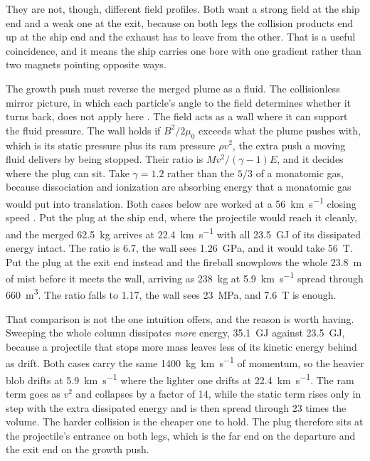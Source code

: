 \documentclass{article}
\begin{document}
They are not, though, different field profiles. Both want a strong field at the ship end and a weak one at the exit, because on both legs the collision products end up at the ship end and the exhaust has to leave from the other. That is a useful coincidence, and it means the ship carries one bore with one gradient rather than two magnets pointing opposite ways.

The growth push must reverse the merged plume as a fluid. The collisionless mirror picture, in which each particle's angle to the field determines whether it turns back, does not apply here \cite{chen2016plasma,Katz_puffsat_impact_sim_2026}. The field acts as a wall where it can support the fluid pressure. The wall holds if $B^2/2\mu_0$ exceeds what the plume pushes with, which is its static pressure plus its ram pressure $\rho v^2$, the extra push a moving fluid delivers by being stopped. Their ratio is $Mv^2/(\gamma-1)E$, and it decides where the plug can sit. Take $\gamma = 1.2$ rather than the $5/3$ of a monatomic gas, because dissociation and ionization are absorbing energy that a monatomic gas would put into translation. Both cases below are worked at a \SI{56}{\kilo\meter\per\second} closing speed \cite{Katz_aim_is_all_you_need_2025}. Put the plug at the ship end, where the projectile would reach it cleanly, and the merged \SI{62.5}{\kilogram} arrives at \SI{22.4}{\kilo\meter\per\second} with all \SI{23.5}{\giga\joule} of its dissipated energy intact. The ratio is 6.7, the wall sees \SI{1.26}{\giga\pascal}, and it would take \SI{56}{\tesla}. Put the plug at the exit end instead and the fireball snowplows the whole \SI{23.8}{\meter} of mist before it meets the wall, arriving as \SI{238}{\kilogram} at \SI{5.9}{\kilo\meter\per\second} spread through \SI{660}{\cubic\meter}. The ratio falls to 1.17, the wall sees \SI{23}{\mega\pascal}, and \SI{7.6}{\tesla} is enough.

That comparison is not the one intuition offers, and the reason is worth having. Sweeping the whole column dissipates \emph{more} energy, \SI{35.1}{\giga\joule} against \SI{23.5}{\giga\joule}, because a projectile that stops more mass leaves less of its kinetic energy behind as drift. Both cases carry the same \SI{1400}{\kilogram\kilo\meter\per\second} of momentum, so the heavier blob drifts at \SI{5.9}{\kilo\meter\per\second} where the lighter one drifts at \SI{22.4}{\kilo\meter\per\second}. The ram term goes as $v^2$ and collapses by a factor of 14, while the static term rises only in step with the extra dissipated energy and is then spread through 23 times the volume. The harder collision is the cheaper one to hold. The plug therefore sits at the projectile's entrance on both legs, which is the far end on the departure and the exit end on the growth push.
\end{document}
